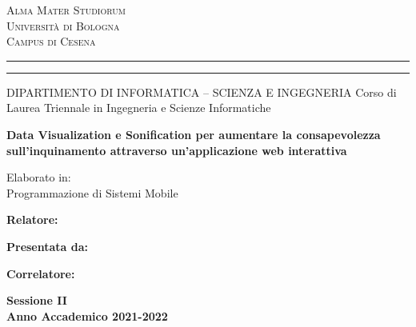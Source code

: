 
\oddsidemargin=25pt

\begin{titlepage}
\begin{center}
{{\Large{\textsc{Alma Mater Studiorum}}}\\
{\Large{\textsc{Universit\`a di Bologna}}} \\
{\textsc{Campus di Cesena}} \rule[0.1cm]{14cm}{0.1mm}
		\rule[0.5cm]{14cm}{0.6mm}
DIPARTIMENTO DI INFORMATICA – SCIENZA E INGEGNERIA
Corso di Laurea Triennale in Ingegneria e Scienze Informatiche }
\end{center}
\vspace{15mm}
\begin{center}
{\LARGE{\bf Data Visualization e Sonification per aumentare la consapevolezza sull’inquinamento attraverso un'applicazione web interattiva}}\\
\end{center}
\vspace{15mm}
\begin{center}
 {\large{ Elaborato in:\\
Programmazione di Sistemi Mobile\\}}   
\end{center}
\vspace{20mm}
\par
\noindent


\begin{minipage}[t]{0.47\textwidth}
{\large{\bf Relatore:\\
\xsupervisor}}
\end{minipage}


\hfill
\begin{minipage}[t]{0.47\textwidth}\raggedleft
{\large{\bf Presentata da:\\
\xstudent}}
\end{minipage}

\vspace{-8mm}

\begin{minipage}[t]{0.47\textwidth}
{\large{\bf Correlatore:\\
\xcosupervisor}}
\end{minipage}



\vspace{20mm}

\begin{center}
{\large{\bf Sessione II\\%
Anno Accademico 2021-2022}}%
\end{center}
\end{titlepage}
